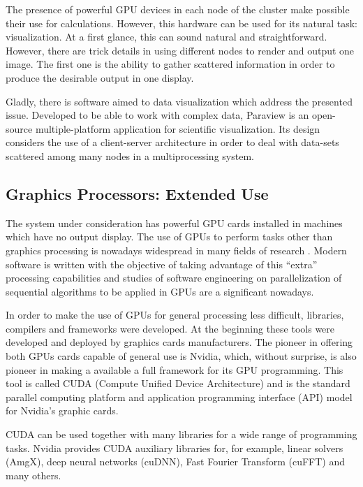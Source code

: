 \documentclass[twoside,a4paper,12pt,english]{inac17}
\begin{document}
The presence of powerful GPU devices in each node of the cluster make possible their use for calculations. However,
this hardware can be used for its natural task: visualization. At a first glance, this can sound natural and
straightforward. However, there are trick details in using different nodes to render and output one image. The first one
is the ability to gather scattered information in order to produce the desirable output in one display.

Gladly, there is software aimed to data visualization which address the presented issue. Developed to be able to work with complex data,
Paraview\cite{paraview} is an open-source multiple-platform application for scientific visualization. Its design considers
the use of a client-server architecture in order to deal with data-sets scattered among many nodes in a multiprocessing
system. 


\subsection{Graphics Processors: Extended Use}

The system under consideration has powerful GPU cards installed in machines
which have no output display. The use of GPUs to perform tasks other than graphics processing
is nowadays widespread in many fields of research \cite{gpgpu}. Modern software is written with
the objective of taking advantage of this ``extra'' processing capabilities and studies of software
engineering on parallelization of sequential algorithms to be applied in GPUs are a significant
nowadays.

In order to make the use of GPUs for general processing less difficult, libraries, compilers and
frameworks were developed. At the beginning these tools were developed and deployed by graphics cards
manufacturers. The pioneer in offering both GPUs cards capable of general use is Nvidia, which,
without surprise, is also pioneer in making a available a full framework for its GPU programming.
This tool is called CUDA (Compute Unified Device Architecture) and is the standard parallel computing platform
and application programming interface (API) model for Nvidia's graphic cards.

CUDA can be used together with many libraries for a wide range of programming tasks. Nvidia provides CUDA
auxiliary libraries for, for example, linear solvers (AmgX), deep neural networks (cuDNN), Fast Fourier Transform (cuFFT) and
many others. 
\end{document}
